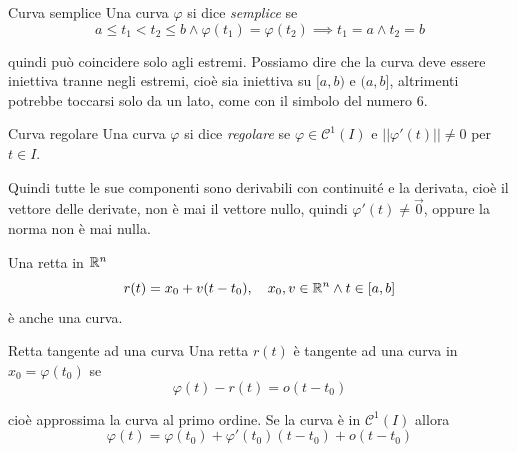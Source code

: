 \documentclass[a4paper]{article}
\begin{document}
\begin{radioactive}
\begin{snippetdefinition}{Curva semplice}
    Una curva \(\varphi\) si dice \emph{semplice} se
    \[
        a \leq t_1 < t_2 \leq b \land \varphi(t_1) = \varphi(t_2)
        \implies t_1 = a \land t_2 = b
    \]
\end{snippetdefinition}
\end{radioactive}

quindi può coincidere solo agli estremi.
Possiamo dire che la curva deve essere iniettiva tranne negli estremi,
cioè sia iniettiva su \([a,b)\) e \((a,b]\),
altrimenti potrebbe toccarsi solo da un lato, come con il simbolo del numero 6.

\begin{radioactive}
\begin{snippetdefinition}{Curva regolare}
    Una curva \(\varphi\) si dice \emph{regolare} se \(\varphi \in \mathcal{C}^1(I)\)
    e \(||\varphi'(t)|| \neq 0\) per \(t\in I\).
\end{snippetdefinition}
\end{radioactive}

Quindi tutte le sue componenti sono derivabili con continuité e la derivata,
cioè il vettore delle derivate, non è mai il vettore nullo, quindi \(\varphi'(t) \neq \vec{0}\),
oppure la norma non è mai nulla.

Una retta in \(\mathbb{R}^n\)
\[ r(t) = x_0 + v(t-t_0), \quad x_0, v \in \mathbb{R}^n \land t\in [a,b]\]
è anche una curva.

\pagebreak

\begin{radioactive}
\begin{snippetdefinition}{Retta tangente ad una curva}
    Una retta \(r(t)\) è tangente ad una curva in \(x_0 = \varphi(t_0)\)
    se
    \[
        \varphi(t) - r(t) = o(t-t_0)
    \]
\end{snippetdefinition}
\end{radioactive}

cioè approssima la curva al primo ordine.
Se la curva è in \(\mathcal{C}^1(I)\) allora \[
\varphi(t) = \varphi(t_0) + \varphi'(t_0)(t-t_0) +o(t-t_0)\]
\end{document}
